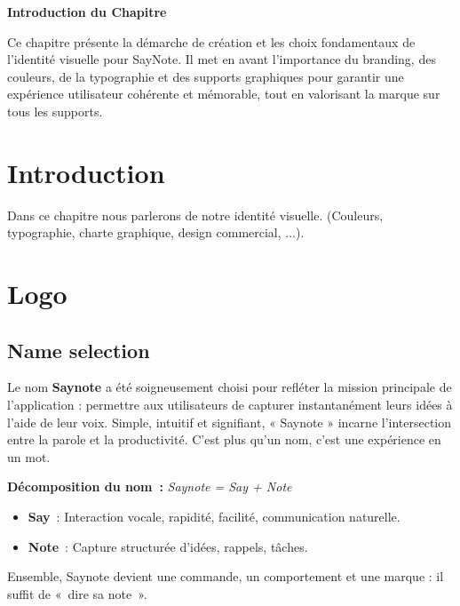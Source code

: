 
\begin{center}
\textbf{\large Introduction du Chapitre}
\end{center}

\noindent
Ce chapitre présente la démarche de création et les choix fondamentaux de l'identité visuelle pour SayNote. Il met en avant l'importance du branding, des couleurs, de la typographie et des supports graphiques pour garantir une expérience utilisateur cohérente et mémorable, tout en valorisant la marque sur tous les supports.

\section{Introduction}
Dans ce chapitre nous parlerons de notre identité visuelle. (Couleurs, typographie, charte graphique, design commercial, ...).

\section{Logo}
\subsection{Name selection}
\begin{tcolorbox}[colback=SayNoteLightGray!10!white, title=Origine du nom]
Le nom \textbf{Saynote} a été soigneusement choisi pour refléter la mission principale de l'application : permettre aux utilisateurs de capturer instantanément leurs idées à l’aide de leur voix. Simple, intuitif et signifiant, « Saynote » incarne l’intersection entre la parole et la productivité. C’est plus qu’un nom, c’est une expérience en un mot.
\end{tcolorbox}

\textbf{Décomposition du nom~:} \textit{Saynote = Say + Note}
\begin{itemize}
    \item \textbf{Say}~: Interaction vocale, rapidité, facilité, communication naturelle.
    \item \textbf{Note}~: Capture structurée d’idées, rappels, tâches.
\end{itemize}

\noindent
Ensemble, Saynote devient une commande, un comportement et une marque : il suffit de «~dire sa note~».

